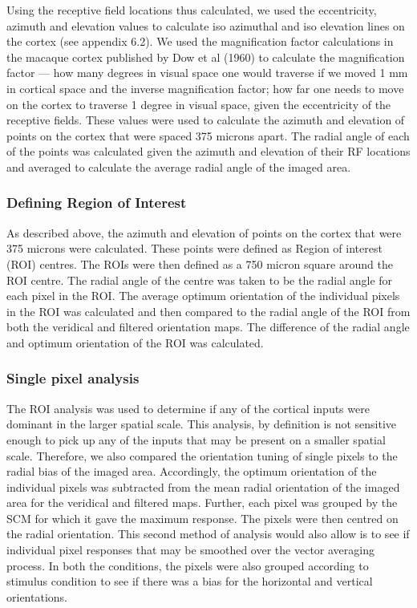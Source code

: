 			
			Using the receptive field locations thus calculated, we used the eccentricity, azimuth and elevation values to calculate iso azimuthal and iso elevation lines on the cortex (see appendix 6.2). We used the magnification factor calculations in the macaque cortex published by Dow et al (1960) to calculate the magnification factor — how many degrees in visual space one would traverse if we moved 1 mm in cortical space and the inverse magnification factor; how far one needs to move on the cortex to traverse 1 degree in visual space, given the eccentricity of the receptive fields. These values were used to calculate the azimuth and elevation of points on the cortex that were spaced 375 microns apart. The radial angle of each of the points was calculated given the azimuth and elevation of their RF locations and averaged to calculate the average radial angle of the imaged area.
			
		\subsubsection{Defining Region of Interest}

			As described above, the azimuth and elevation of points on the cortex that were 375 microns were calculated. These points were defined as Region of interest (ROI) centres. The ROIs were then defined as a 750 micron square around the ROI centre. The radial angle of the centre was taken to be the radial angle for each pixel in the ROI. The average optimum orientation of the individual pixels in the ROI was calculated and then compared to the radial angle of the ROI from both the veridical and filtered orientation maps. The difference of the radial angle and optimum orientation of the ROI was calculated.
			
			
		\subsubsection{Single pixel analysis}
		
			The ROI analysis was used to determine if any of the cortical inputs were dominant in the larger spatial scale. This analysis, by definition is not sensitive enough to pick up any of the inputs that may be present on a smaller spatial scale. Therefore, we also compared the orientation tuning of single pixels to the radial bias of the imaged area. Accordingly, the optimum orientation of the individual pixels was subtracted from the mean radial orientation of the imaged area for the veridical and filtered maps. Further, each pixel was grouped by the SCM for which it gave the maximum response. The pixels were then centred on the radial orientation. This second method of analysis would also allow is to see if individual pixel responses that may be smoothed over the vector averaging process. In both the conditions, the pixels were also grouped according to stimulus condition to see if there was a bias for the horizontal and vertical orientations.
